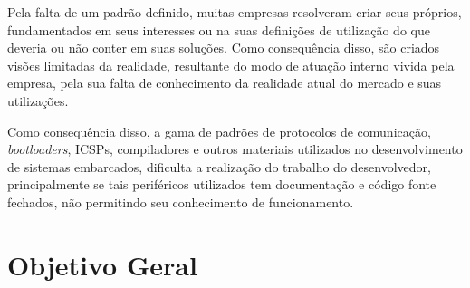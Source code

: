 Pela falta de um padrão definido, muitas empresas resolveram criar seus próprios, fundamentados em seus interesses ou na suas definições de utilização do que deveria ou não conter em suas soluções. Como consequência disso, são criados visões limitadas da realidade, resultante do modo de atuação interno vivida pela empresa, pela sua falta de conhecimento da realidade atual do mercado e suas utilizações.

Como consequência disso, a gama de padrões de protocolos de comunicação, \textit{bootloaders}, ICSPs, compiladores e outros materiais utilizados no desenvolvimento de sistemas embarcados, dificulta a realização do trabalho do desenvolvedor, principalmente se tais periféricos utilizados tem documentação e código fonte fechados, não permitindo seu conhecimento de funcionamento.
\fi

\section{Objetivo Geral}


\iffalse
O objetivo geral deve responder as seguintes perguntas:
1) O que a sua organização deseja realizar com o Projeto?
2) Qual problema em especial se quer solucionar?
3) Que mudanças se quer alcançar?
4) Que diferença o projeto quer fazer?

Deve ser escrito em tempo infinitivo (por exemplo: ampliar, capacitar, entre outros) e redigido com claridade. O objetivo precisa ser alcançável, não pode ser genérico, de forma que o projeto não consiga resolver (ex: terminar com a fome no mundo). Por outro lado deve ser ousado, capaz de sinalizar mudanças mais profundas que poderão ser alcançadas pelo projeto a médio e longo prazo.
\fi

